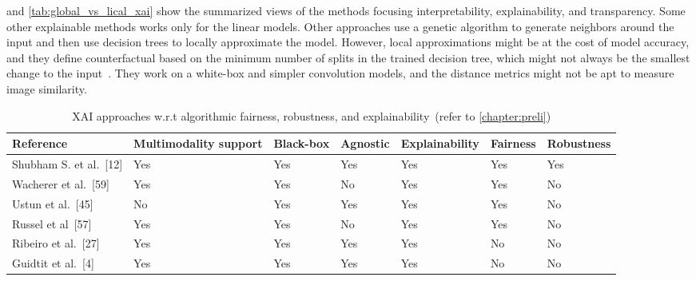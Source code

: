 \hspace*{3.5mm}  and \cref{tab:global_vs_lical_xai} show the summarized views of the methods focusing interpretability, explainability, and transparency. Some other explainable methods works only for the linear models. Other approaches use a genetic algorithm to generate neighbors around the input and then use decision trees to locally approximate the model. However, local approximations might be at the cost of model accuracy, and they define counterfactual based on the minimum number of splits in the trained decision tree, which might not always be the smallest change to the input~\cite{li2017comprehensive}. They work on a white-box and simpler convolution models, and the distance metrics might not be apt to measure image similarity. 

\begin{table}[h]
    \centering
    \caption[XAI approaches w.r.t algorithmic fairness, robustness, and explainability]{XAI approaches w.r.t algorithmic fairness, robustness, and explainability~(refer to \cref{chapter:preli})}
    \label{tab:multimodal_xai_approaches}
    \scriptsize
    \vspace{-2mm}
    \begin{tabular}{l|l|l|l|l|l|l} 
        \hline
        \textbf{Reference}                & \textbf{Multimodality support} & \textbf{Black-box} & \textbf{Agnostic} & \textbf{Explainability} & \textbf{Fairness} & \textbf{Robustness}  \\ 
        \hline
        Shubham S. et al.~[12]   & Yes                   & Yes       & Yes            & Yes            & Yes      & Yes         \\ 
        \hline
        Wacherer et al.~[59]     & Yes                   & Yes       & No             & Yes            & Yes      & No          \\ 
        \hline
        Ustun et al.~[45]        & No                    & Yes       & Yes            & Yes            & Yes      & No          \\ 
        \hline
        Russel et al~[57]       & Yes                   & Yes       & No             & Yes            & Yes      & No          \\ 
        \hline
        Ribeiro et al.~[27]      & Yes                   & Yes       & Yes            & Yes            & No       & No          \\ 
        \hline
        Guidtit et al.~[4]      & Yes                   & Yes       & Yes            & Yes            & No       & No          \\ 

\end{tabular}
\end{table}
